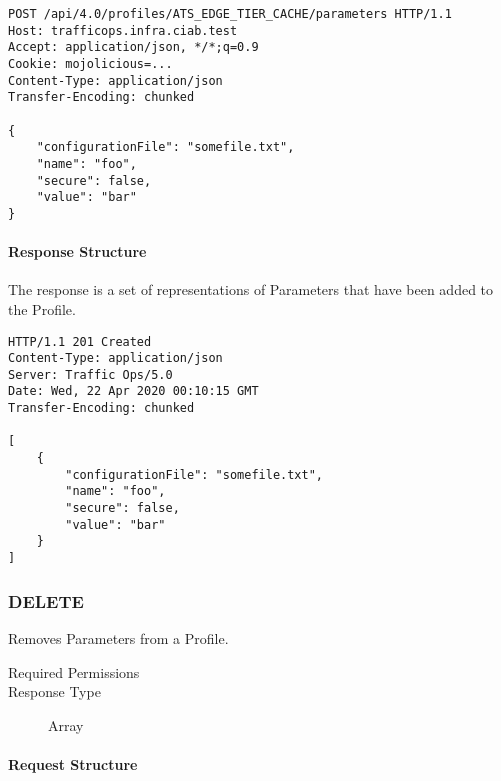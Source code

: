\begin{codelisting}
\begin{verbatim}
POST /api/4.0/profiles/ATS_EDGE_TIER_CACHE/parameters HTTP/1.1
Host: trafficops.infra.ciab.test
Accept: application/json, */*;q=0.9
Cookie: mojolicious=...
Content-Type: application/json
Transfer-Encoding: chunked

{
	"configurationFile": "somefile.txt",
	"name": "foo",
	"secure": false,
	"value": "bar"
}
\end{verbatim}
\end{codelisting}

\paragraph{Response Structure}
The response is a set of representations of Parameters that have been added to
the Profile.

\begin{codelisting}
\begin{verbatim}
HTTP/1.1 201 Created
Content-Type: application/json
Server: Traffic Ops/5.0
Date: Wed, 22 Apr 2020 00:10:15 GMT
Transfer-Encoding: chunked

[
	{
		"configurationFile": "somefile.txt",
		"name": "foo",
		"secure": false,
		"value": "bar"
	}
]
\end{verbatim}
\end{codelisting}

\subsubsection{DELETE}
Removes Parameters from a Profile.

\begin{description}
	\item[Required Permissions] 
	\item[Response Type] Array
\end{description}

\paragraph{Request Structure}
